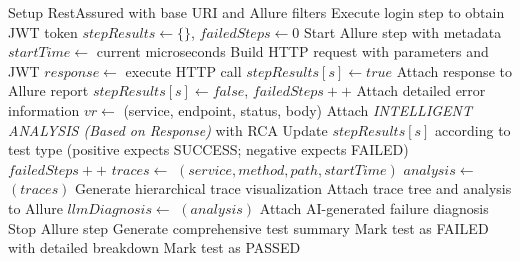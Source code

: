 \documentclass[conference]{IEEEtran}
\begin{document}
\begin{algorithm}[tb]
\caption{GENERATED\_TEST\_EXECUTION\_FLOW}\label{alg:execute}
\footnotesize
\begin{algorithmic}[1]
\Require{}
\Ensure{}
\State Setup RestAssured with base URI and Allure filters
    \State Execute login step to obtain JWT token
    \State $stepResults \gets \{\}$, $failedSteps \gets 0$
        \State Start Allure step with metadata
        \State $startTime \gets$ current microseconds
        \State Build HTTP request with parameters and JWT
        \State $response \gets$ execute HTTP call
            \State $stepResults[s] \gets true$
            \State Attach response to Allure report
        \Else
            \State $stepResults[s] \gets false$, $failedSteps++$
            \State Attach detailed error information
        \EndIf
            \State $vr \gets$ (service, endpoint, status, body)
            \State Attach \emph{INTELLIGENT ANALYSIS (Based on Response)} with RCA
            \State Update $stepResults[s]$ according to test type (positive expects SUCCESS; negative expects FAILED)
                \State $failedSteps++$
            \EndIf
        \EndIf
        \State $traces \gets$ $(service, method, path, startTime)$
            \State $analysis \gets$ $(traces)$
            \State Generate hierarchical trace visualization
            \State Attach trace tree and analysis to Allure
                \State $llmDiagnosis \gets$ $(analysis)$
                \State Attach AI-generated failure diagnosis
            \EndIf
        \EndIf
        \State Stop Allure step
    \EndFor
    \State Generate comprehensive test summary
        \State Mark test as FAILED with detailed breakdown
    \Else
        \State Mark test as PASSED
    \EndIf
\EndFor
\end{algorithmic}
\end{algorithm}
\end{document}
